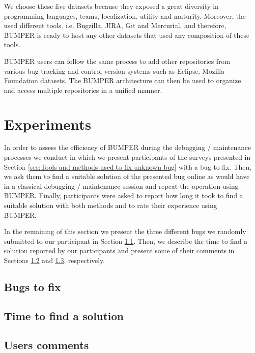 \documentclass[conference]{IEEEtran}
\begin{document}
We choose these five datasets because they exposed a great diversity in programming languages, teams, localization, utility and maturity.
Moreover, the used different tools, i.e.
Bugzilla, JIRA, Git and Mercurial, and therefore, BUMPER is ready to host any other datasets that used any composition of these tools.

BUMPER users can follow the same process to add other
repositories from various bug tracking and control version
systems such as Eclipse, Mozilla Foundation datasets. The BUMPER architecture can then be used to organize and
access multiple repositories in a unified manner.

\section{Experiments}
\label{sec:Experiments}

In order to assess the efficiency of BUMPER during the debugging / maintenance processes we conduct in which we present participants of the surveys presented in Section \ref{sec:Tools and methods used to fix unknown bug} with a bug to fix.
Then, we ask them to find a suitable solution of the presented bug online as would have in a classical debugging / maintenance session and repeat the operation using BUMPER.
Finally, participants were asked to report how long it took to find a suitable solution with both methods and to rate their experience using BUMPER.

In the remaining of this section we present the three different bugs we randomly submitted to our participant in Section \ref{sub:Bugs to fix}. Then, we describe the time to find a solution reported by our participants and present some of their comments in Sections \ref{sub:Time to find a solution} and \ref{sub:Users comments}, respectively.

\subsection{Bugs to fix}
\label{sub:Bugs to fix}

\subsection{Time to find a solution}
\label{sub:Time to find a solution}

\subsection{Users comments}
\label{sub:Users comments}
\end{document}
